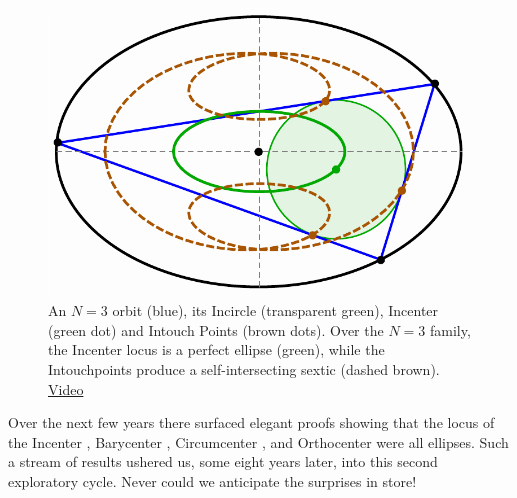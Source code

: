 \begin{figure}
    \centering
    \includegraphics[width=.7\textwidth]{pics/u1001_intro_plot.pdf}
    \caption{An $N=3$ orbit (blue), its Incircle (transparent green), Incenter (green dot) and Intouch Points (brown dots). Over the $N=3$ family, the Incenter locus is a perfect ellipse (green), while the Intouchpoints produce a self-intersecting sextic (dashed brown).
    \href{https://youtu.be/9xU6T7hQMzs}{Video} \cite[pl\#2]{dsr_math_intell_playlist}}
    \label{fig:intro-plot}
\end{figure}
%
 Over the next few years there surfaced elegant proofs showing that the locus of the Incenter \cite{ronaldo16,olga14}, Barycenter \cite{ronaldo19,sergei2016}, Circumcenter  \cite{corentin19,ronaldo19}, and Orthocenter \cite{ronaldo19} were all ellipses. Such a stream of results ushered us, some eight years later, into this second exploratory cycle. Never could we anticipate the surprises in store!

